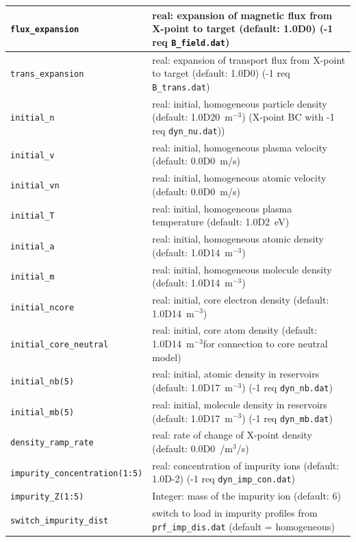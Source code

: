 \documentclass[amsmath,amssymb,a4]{revtex4-2}
\begin{document}
\begin{longtable}{| p{} | p{} |}
    {\tt flux\_expansion}         & real: expansion of magnetic flux from X-point to target (default: 1.0D0) (-1 req {\tt B\_field.dat})\\ \hline
    {\tt trans\_expansion}        & real: expansion of transport flux from X-point to target (default: 1.0D0) (-1 req {\tt B\_trans.dat})\\ \hline
    {\tt initial\_n}              & real: initial, homogeneous particle density (default: 1.0D20~m$^{-3}$) (X-point BC with -1 req {\tt dyn\_nu.dat})) \\ \hline
    {\tt initial\_v}              & real: initial, homogeneous plasma velocity (default: 0.0D0~m/s) \\ \hline
    {\tt initial\_vn}             & real: initial, homogeneous atomic velocity (default: 0.0D0~m/s) \\ \hline
    {\tt initial\_T}              & real: initial, homogeneous plasma temperature (default: 1.0D2~eV) \\ \hline
    {\tt initial\_a}              & real: initial, homogeneous atomic density (default: 1.0D14~m$^{-3}$) \\ \hline
    {\tt initial\_m}              & real: initial, homogeneous molecule density (default: 1.0D14~m$^{-3}$) \\ \hline
    {\tt initial\_ncore}          & real: initial, core electron density (default: 1.0D14~m$^{-3}$) \\ \hline
    {\tt initial\_core\_neutral}  & real: initial, core atom density (default: 1.0D14~m$^{-3}$for connection to core neutral model) \\ \hline
    {\tt initial\_nb(5)}          & real: initial, atomic density in reservoirs (default: 1.0D17~m$^{-3}$) (-1 req {\tt dyn\_nb.dat}) \\ \hline
    {\tt initial\_mb(5)}         & real: initial, molecule density in reservoirs (default: 1.0D17~m$^{-3}$)  (-1 req {\tt dyn\_mb.dat})  \\ \hline
     {\tt density\_ramp\_rate}    & real: rate of change of X-point density (default: 0.0D0~/m$^3$/s) \\ \hline
    {\tt impurity\_concentration(1:5)} & real: concentration of impurity ions (default: 1.0D-2) (-1 req {\tt dyn\_imp\_con.dat}) \\ \hline
    {\tt impurity\_Z(1:5)}      & Integer: mass of the impurity ion (default: 6) \\ \hline
    {\tt switch\_impurity\_dist}& switch to load in impurity profiles from {\tt prf\_imp\_dis.dat} (default = homogeneous) \\ \hline

\end{longtable}
\end{document}
